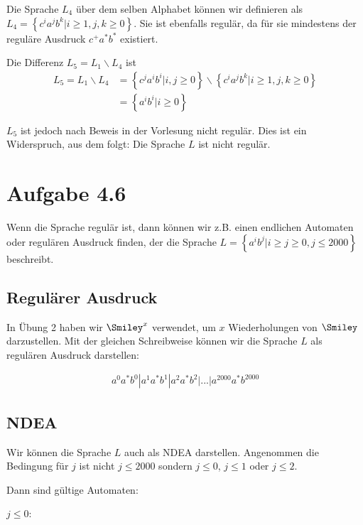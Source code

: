 \documentclass{article}
\begin{document}
Die Sprache $L_4$ über dem selben Alphabet können wir definieren als $L_4 = \left\{c^ia^jb^k | i \geq 1, j, k \geq 0 \right\}$. Sie ist ebenfalls regulär, da für sie mindestens der reguläre Ausdruck $c^+a^*b^*$ existiert.

Die Differenz $L_5 = L_1 \backslash L_4$ ist
\begin{align*}
L_5 = L_1 \backslash L_4 &= \left\{c^ja^ib^i | i,j \geq 0 \right\} \backslash \left\{c^ia^jb^k | i \geq 1, j, k \geq 0 \right\} \\
                         &= \left\{a^ib^i | i \geq 0 \right\}
\end{align*}

$L_5$ ist jedoch nach Beweis in der Vorlesung nicht regulär. Dies ist ein Widerspruch, aus dem folgt: Die Sprache $L$ ist nicht regulär.



\section*{Aufgabe 4.6}
Wenn die Sprache regulär ist, dann können wir z.B. einen endlichen Automaten oder regulären Ausdruck finden, der die Sprache $L = \left\{a^ib^j | i \geq j \geq 0, j \leq 2000 \right\}$ beschreibt.

\subsection*{Regulärer Ausdruck}
\begin{samepage}
In Übung 2 haben wir $\Smiley^x$ verwendet, um $x$ Wiederholungen von $\Smiley$ darzustellen. Mit der gleichen Schreibweise können wir die Sprache $L$ als regulären Ausdruck darstellen:

\begin{align*}
a^0a^*b^0|a^1a^*b^1|a^2a^*b^2|...|a^{2000}a^*b^{2000}
\end{align*}
\end{samepage}

\subsection*{NDEA}
Wir können die Sprache $L$ auch als NDEA darstellen. Angenommen die Bedingung für $j$ ist nicht $j \leq 2000$ sondern $j \leq 0$, $j\leq 1$ oder $j \leq 2$.

Dann sind gültige Automaten:

\begin{samepage}
$j \leq 0$:

\begin{center}
\end{center}
\end{samepage}
\end{document}
